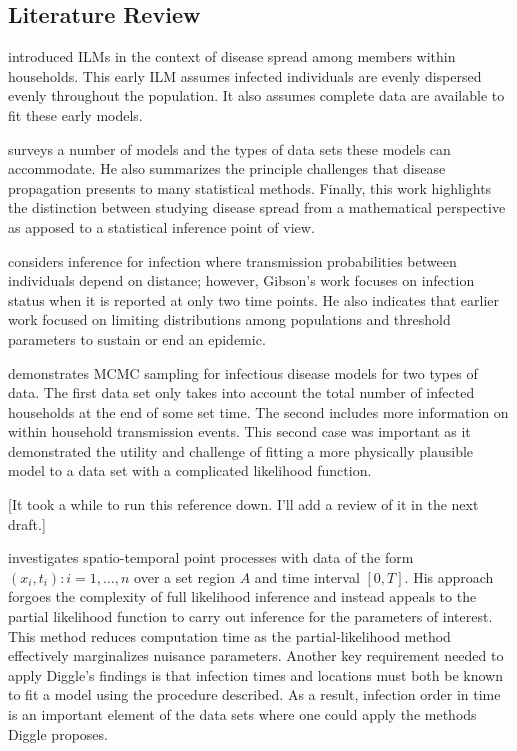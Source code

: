 \documentclass{uwstat572}
\begin{document}
\subsection{Literature Review}
\cite{Haber} introduced ILMs in the context of disease spread among members within households. This early ILM assumes infected individuals are evenly dispersed evenly throughout the population. It also assumes complete data are available to fit these early models. 

\cite{Becker} surveys a number of models and the types of data sets these models can accommodate. 
He also summarizes the principle challenges that disease propagation presents to many statistical methods.
Finally, this work highlights the distinction between studying disease spread from a mathematical perspective as apposed to a statistical inference point of view.  

\cite{Gibson} considers inference for infection where transmission probabilities between individuals depend on distance; however, Gibson's work focuses on infection status when it is reported at only two time points. 
He also indicates that earlier work focused on limiting distributions among populations and threshold parameters to sustain or end an epidemic. 

\cite{ONeill} demonstrates MCMC sampling for infectious disease models for two types of data. 
The first data set only takes into account the total number of infected households at the end of some set time.
The second includes more information on within household transmission events.
This second case was important as it demonstrated the utility and challenge of fitting a more physically plausible model to a data set with a complicated likelihood function.

\cite{McKinley} [It took a while to run this reference down. I'll add a review of it in the next draft.]

\cite{Diggle} investigates spatio-temporal point processes with data of the form $(x_i, t_i): i=1, \dots, n$ over a set region $A$ and time interval $[0, T]$. 
His approach forgoes the complexity of full likelihood inference and instead appeals to the partial likelihood function to carry out inference for the parameters of interest. 
This method reduces computation time as the partial-likelihood method effectively marginalizes nuisance parameters. 
Another key requirement needed to apply Diggle's findings is that infection times and locations must both be known to fit a model using the procedure described.
As a result, infection order in time is an important element of the data sets where one could apply the methods Diggle proposes. 
\end{document}
